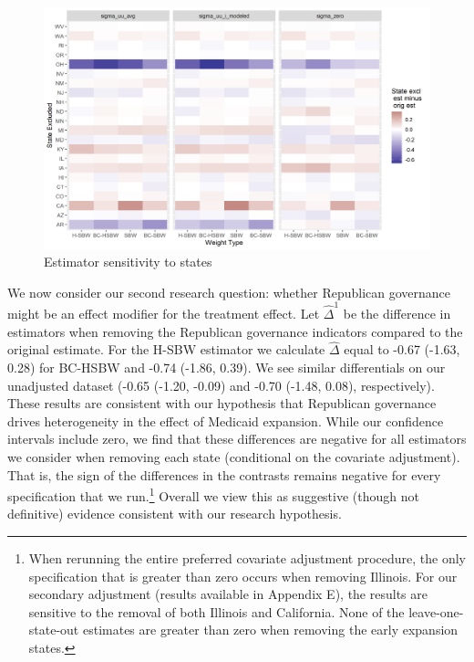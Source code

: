 \documentclass[aoas]{imsart}
\theoremstyle{plain}
\theoremstyle{remark}
\begin{document}
\begin{figure}
\begin{center}
    \caption{Estimator sensitivity to states}
    \label{fig:loostateplot}
    \includegraphics[scale=0.6]{01_Plots/loostate-sensitivityc1-state-uu-i.png}
\end{center}
\end{figure}

We now consider our second research question: whether Republican governance might be an effect modifier for the treatment effect. Let $\hat{\Delta}^1$ be the difference in estimators when removing the Republican governance indicators compared to the original estimate. For the H-SBW estimator we calculate $\hat{\Delta}$ equal to -0.67 (-1.63, 0.28) for BC-HSBW and -0.74 (-1.86, 0.39). We see similar differentials on our unadjusted dataset (-0.65 (-1.20, -0.09) and -0.70 (-1.48, 0.08), respectively). These results are consistent with our hypothesis that Republican governance drives heterogeneity in the effect of Medicaid expansion. While our confidence intervals include zero, we find that these differences are negative for all estimators we consider when removing each state (conditional on the covariate adjustment). That is, the sign of the differences in the contrasts remains negative for every specification that we run.\footnote{When rerunning the entire preferred covariate adjustment procedure, the only specification that is greater than zero occurs when removing Illinois. For our secondary adjustment (results available in Appendix E), the results are sensitive to the removal of both Illinois and California. None of the leave-one-state-out estimates are greater than zero when removing the early expansion states.} Overall we view this as suggestive (though not definitive) evidence consistent with our research hypothesis.
\end{document}
